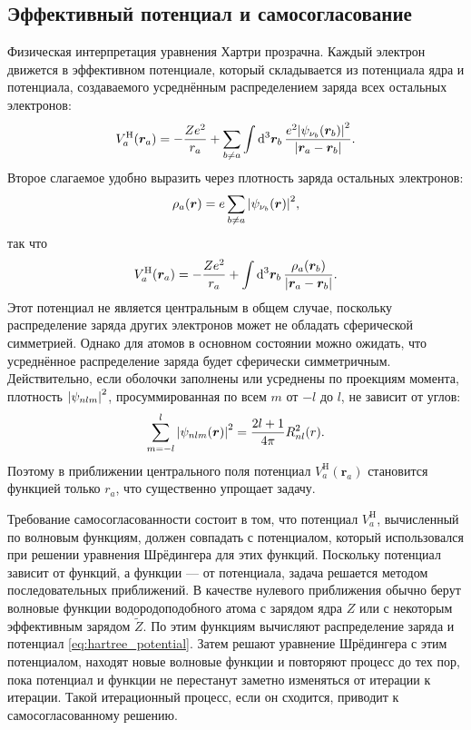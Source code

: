 \documentclass[a4paper, 12pt]{article}
\numberwithin{equation}{section}
\begin{document}
\subsection{Эффективный потенциал и самосогласование}
\label{subsec:hartree_effective_potential}

Физическая интерпретация уравнения Хартри прозрачна. Каждый электрон движется в эффективном потенциале, который складывается из потенциала ядра и потенциала, создаваемого усреднённым распределением заряда всех остальных электронов:
\begin{equation}
\label{eq:hartree_potential}
V_a^{\text{H}}(\bm{r}_a) = - \frac{Z e^2}{r_a} + \sum_{b \neq a} \int \dd[3]{\bm{r}_b} \frac{e^2 \abs{\psi_{\nu_b}(\bm{r}_b)}^2}{\abs{\bm{r}_a - \bm{r}_b}}.
\end{equation}
Второе слагаемое удобно выразить через плотность заряда остальных электронов:
\begin{equation}
\label{eq:hartree_density}
\rho_a(\bm{r}) = e \sum_{b \neq a} \abs{\psi_{\nu_b}(\bm{r})}^2,
\end{equation}
так что
\begin{equation}
V_a^{\text{H}}(\bm{r}_a) = - \frac{Z e^2}{r_a} + \int \dd[3]{\bm{r}_b} \frac{\rho_a(\bm{r}_b)}{\abs{\bm{r}_a - \bm{r}_b}}.
\end{equation}
Этот потенциал не является центральным в общем случае, поскольку распределение заряда других электронов может не обладать сферической симметрией. Однако для атомов в основном состоянии можно ожидать, что усреднённое распределение заряда будет сферически симметричным. Действительно, если оболочки заполнены или усреднены по проекциям момента, плотность $\abs{\psi_{nlm}}^2$, просуммированная по всем $m$ от $-l$ до $l$, не зависит от углов:
\begin{equation}
\label{eq:spherical_density}
\sum_{m=-l}^{l} \abs{\psi_{nlm}(\bm{r})}^2 = \frac{2l+1}{4\pi} R_{nl}^2(r).
\end{equation}
Поэтому в приближении центрального поля потенциал $V_a^{\text{H}}(\bm{r}_a)$ становится функцией только $r_a$, что существенно упрощает задачу.

Требование самосогласованности состоит в том, что потенциал $V_a^{\text{H}}$, вычисленный по волновым функциям, должен совпадать с потенциалом, который использовался при решении уравнения Шрёдингера для этих функций. Поскольку потенциал зависит от функций, а функции --- от потенциала, задача решается методом последовательных приближений. В качестве нулевого приближения обычно берут волновые функции водородоподобного атома с зарядом ядра $Z$ или с некоторым эффективным зарядом $\tilde{Z}$. По этим функциям вычисляют распределение заряда и потенциал \eqref{eq:hartree_potential}. Затем решают уравнение Шрёдингера с этим потенциалом, находят новые волновые функции и повторяют процесс до тех пор, пока потенциал и функции не перестанут заметно изменяться от итерации к итерации. Такой итерационный процесс, если он сходится, приводит к самосогласованному решению.
\end{document}
